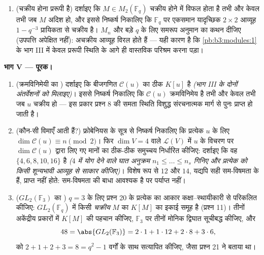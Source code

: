 \begin{problem}
\begin{enumerate}[resume]
{        और स्मरण रखिए कि व्युत्क्रमणीयता अचर पदों को सीमित करती
        है।)}
  \item (चक्रीय होना प्ररूपी है) दर्शाइए कि $M \in M_2(\mathbb F_q)$ चक्रीय होने
        में विफल होता है तभी और केवल तभी जब $M$ अदिश हो, और
        इससे निष्कर्ष निकालिए कि $\mathbb F_q$ पर एकसमान यादृच्छिक
        $2\times2$ आव्यूह $1 - q^{-3}$ प्रायिकता से चक्रीय है। $M_n$ और बड़े
        $q$ के लिए समरूप अनुमान का कथन दीजिए (उपपत्ति अपेक्षित
        नहीं): अचक्रीय आव्यूह विरल होते हैं --- यही कारण है कि
        \cref{pb:b3:modules:1} के भाग III में केवल प्ररूपी स्थिति के आगे ही
        वास्तविक परिश्रम करना पड़ा।
\end{enumerate}

\medskip
\noindent\textbf{भाग V --- पूरक।}
\begin{enumerate}[resume]
  \item (क्रमविनिमेयी का ) दर्शाइए कि बीजगणित $\mathcal C(u)$ का
         ठीक $K[u]$ है \emph{(भाग III के दोनों अंतर्वेशनों
        को मिलाइए)}। इससे निष्कर्ष निकालिए कि $\mathcal C(u)$ क्रमविनिमेय
        है तभी और केवल तभी जब $u$ चक्रीय हो --- इस प्रकार
        प्रश्न 8 की समता स्थिति विशुद्ध संरचनात्मक मार्ग से पुनः
        प्राप्त हो जाती है।
  \item (कौन-सी विमाएँ आती हैं?) फ्रोबेनियस के सूत्र से निष्कर्ष
        निकालिए कि प्रत्येक $u$ के लिए $\dim\mathcal C(u) \equiv n \pmod 2$। फिर $\dim V = 4$ वाले
        $\mathcal L(V)$ में $u$ के विचरण पर $\dim \mathcal C(u)$ द्वारा लिए गए मानों का
        ठीक-ठीक समुच्चय निर्धारित कीजिए: दर्शाइए कि वह $\{4, 6,
        8, 10, 16\}$ है
        \emph{($4$ में योग देने वाले घात अनुक्रम $n_1
        \leq \dots \leq n_s$ गिनिए
        और प्रत्येक को किसी शून्यभावी आव्यूह से साकार कीजिए)}।
        विशेष रूप से $12$ और $14$, यद्यपि सही सम-विषमता के
        हैं, प्राप्त नहीं होते: सम-विषमता की बाधा आवश्यक है पर
        पर्याप्त नहीं।
  \item ($GL_2(\mathbb F_3)$ का ) $q = 3$ के लिए प्रश्न 20 के
        प्रत्येक  का आकार कक्षा--स्थायीकारी से
        परिकलित कीजिए: $GL_2(\mathbb F_q)$ में किसी \emph{चक्रीय} $M$ का
         $K[M]$ का इकाई समूह है (प्रश्न 11)। तीनों
        अकेंद्रीय प्रकारों में $K[M]$ की पहचान कीजिए, $\mathbb F_3$ पर
        तीनों मोनिक  द्विघात सूचीबद्ध कीजिए, और 
        \[
        48 = \abs{GL_2(\mathbb F_3)}
        = 2\cdot1 + 1\cdot12 + 2\cdot8 + 3\cdot6,
        \]
        को $2 + 1 + 2 + 3 = 8 = q^2 - 1$ वर्गों के साथ सत्यापित कीजिए, जैसा प्रश्न 21 ने
        बताया था।
\end{enumerate}
\end{problem}
